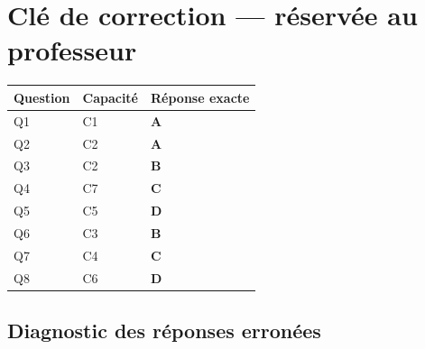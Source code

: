 \ifnxVersionProfesseur
\clearpage
\section*{Clé de correction — réservée au professeur}

\begin{center}
\begin{tabular}{lll}
\hline
Question & Capacité & Réponse exacte \\
\hline
Q1 & C1 & \textbf{A} \\
Q2 & C2 & \textbf{A} \\
Q3 & C2 & \textbf{B} \\
Q4 & C7 & \textbf{C} \\
Q5 & C5 & \textbf{D} \\
Q6 & C3 & \textbf{B} \\
Q7 & C4 & \textbf{C} \\
Q8 & C6 & \textbf{D} \\
\hline
\end{tabular}
\end{center}

\subsection*{Diagnostic des réponses erronées}


